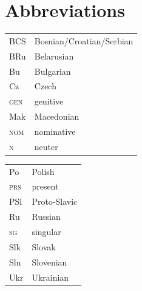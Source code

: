 \documentclass[output=paper]{langscibook}
\begin{document}
\section*{Abbreviations}
\begin{tabularx}{.45\textwidth}{lQ}
BCS & Bosnian/Croatian/Serbian \\
BRu & Belarusian               \\
Bu  &Bulgarian                 \\
Cz  &Czech                     \\
\textsc{gen} & genitive        \\
Mak & Macedonian               \\
\textsc{nom} & nominative      \\
\textsc{n} &  neuter      \\
\end{tabularx}
\begin{tabularx}{.45\textwidth}{lQ}
Po & Polish               \\
\textsc{prs} &  present   \\
PSl &  Proto-Slavic       \\
Ru  &Russian              \\
\textsc{sg}&  singular    \\
Slk  &Slovak              \\
Sln  &Slovenian           \\
Ukr  &Ukrainian           \\
\end{tabularx}

\sloppy\printbibliography[heading=subbibliography,notkeyword=this]
\end{document}
